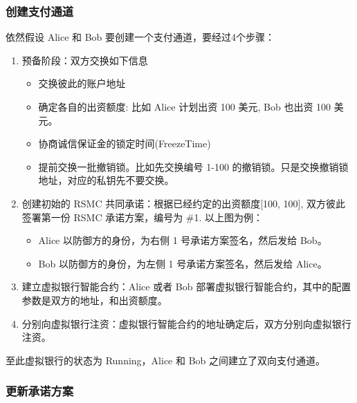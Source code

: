 \subsubsection{创建支付通道}
依然假设 Alice 和 Bob 要创建一个支付通道，要经过4个步骤：
\begin{enumerate}
    \item 预备阶段：双方交换如下信息
        \begin{itemize}
            \item 交换彼此的账户地址 
            \item 确定各自的出资额度: 比如 Alice 计划出资 100 美元, Bob 也出资 100 美元。
            \item 协商诚信保证金的锁定时间(FreezeTime)
            \item 提前交换一批撤销锁。比如先交换编号 1-100 的撤销锁。只是交换撤销锁地址，对应的私钥先不要交换。
        \end{itemize}
    
    \item 创建初始的 RSMC 共同承诺：根据已经约定的出资额度[100, 100], 双方彼此签署第一份 RSMC 承诺方案，编号为 \#1. 以上图为例：
        \begin{itemize}
        \item Alice 以防御方的身份，为右侧 1 号承诺方案签名，然后发给 Bob。
        \item Bob 以防御方的身份，为左侧 1 号承诺方案签名，然后发给 Alice。
        \end{itemize}

    \item 建立虚拟银行智能合约：Alice 或者 Bob 部署虚拟银行智能合约，其中的配置参数是双方的地址，和出资额度。
    \item 分别向虚拟银行注资：虚拟银行智能合约的地址确定后，双方分别向虚拟银行注资。
\end{enumerate}


至此虚拟银行的状态为 Running，Alice 和 Bob 之间建立了双向支付通道。

\subsubsection{更新承诺方案}

